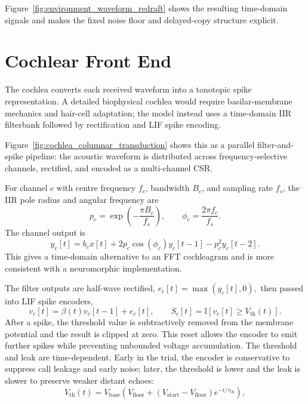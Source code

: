 Figure~\ref{fig:environment_waveform_redraft} shows the resulting time-domain signals and makes the fixed noise floor and delayed-copy structure explicit.


\section{Cochlear Front End}

The cochlea converts each received waveform into a tonotopic spike representation. A detailed biophysical cochlea would require basilar-membrane mechanics and hair-cell adaptation; the model instead uses a time-domain IIR filterbank followed by rectification and LIF spike encoding.



Figure~\ref{fig:cochlea_columnar_transduction} shows this as a parallel filter-and-spike pipeline: the acoustic waveform is distributed across frequency-selective channels, rectified, and encoded as a multi-channel CSR.

For channel $c$ with centre frequency $f_c$, bandwidth $B_c$, and sampling rate $f_s$, the IIR pole radius and angular frequency are
\begin{equation}
    p_c = \exp\left(-\frac{\pi B_c}{f_s}\right),
    \qquad
    \phi_c = \frac{2\pi f_c}{f_s}.
\end{equation}
The channel output is
\begin{equation}
    y_c[t] =
    b_c x[t]
    + 2p_c\cos(\phi_c)y_c[t-1]
    - p_c^2 y_c[t-2].
\end{equation}
This gives a time-domain alternative to an FFT cochleagram and is more consistent with a neuromorphic implementation.

The filter outputs are half-wave rectified, $e_c[t] = \max(y_c[t],0),$ then passed into LIF spike encoders,
\begin{equation}
    v_c[t] = \beta(t)v_c[t-1] + e_c[t],
    \qquad
    S_c[t] = \mathbb{I}[v_c[t]\geq V_{\mathrm{th}}(t)].
\end{equation}
After a spike, the threshold value is subtractively removed from the membrane potential and the result is clipped at zero. This reset allows the encoder to emit further spikes while preventing unbounded voltage accumulation.
The threshold and leak are time-dependent. Early in the trial, the encoder is conservative to suppress call leakage and early noise; later, the threshold is lower and the leak is slower to preserve weaker distant echoes:
\begin{equation}
    V_{\mathrm{th}}(t)
    =
    V_{\mathrm{base}}
    \left(
    V_{\mathrm{floor}}
    +
    (V_{\mathrm{start}}-V_{\mathrm{floor}})
    e^{-t/\tau_{\mathrm{th}}}
    \right),
\end{equation}

